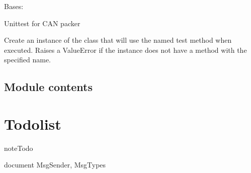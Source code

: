 \documentclass[letterpaper,10pt,english]{sphinxmanual}
\begin{document}
\begin{fulllineitems}
\label{tests:tests.test_can.TestCanPacker}
Bases: 

Unittest for CAN packer

Create an instance of the class that will use the named test
method when executed. Raises a ValueError if the instance does
not have a method with the specified name.

\begin{fulllineitems}
\label{tests:tests.test_can.TestCanPacker.test_decode_booleans}
\end{fulllineitems}


\begin{fulllineitems}
\label{tests:tests.test_can.TestCanPacker.test_encode_booleans}
\end{fulllineitems}


\begin{fulllineitems}
\label{tests:tests.test_can.TestCanPacker.test_pack}
\end{fulllineitems}


\begin{fulllineitems}
\label{tests:tests.test_can.TestCanPacker.test_unpack}
\end{fulllineitems}


\end{fulllineitems}



\section{Module contents}
\label{tests:module-tests}\label{tests:module-contents}

\chapter{Todolist}
\label{index:todolist}
\begin{notice}{note}{Todo}

document MsgSender, MsgTypes
\end{notice}
\end{document}
